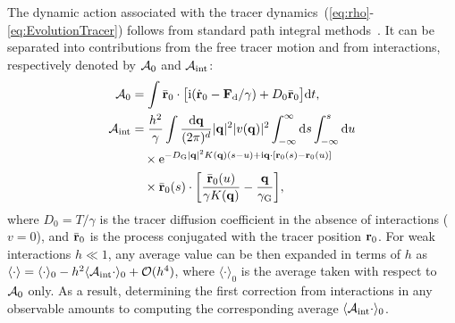 \documentclass[pre, superscriptaddress, twocolumn,pre]{revtex4-1}
\begin{document}
The dynamic action associated with the tracer dynamics~(\ref{eq:rho}-\ref{eq:EvolutionTracer}) follows from standard path integral methods~\cite{Martin1973, Dominicis1975}. It can be separated into contributions from the free tracer motion and from interactions, respectively denoted by ${\cal A}_0$ and ${\cal A}_{\rm int}$:
\begin{equation}\label{eq:action}
	\begin{aligned}
		{\cal A}_0 &= \int \bar{\bf r}_0 \cdot \big[ {\rm i}(\dot{\bf r}_0 - {\bf F}_{\rm d}/\gamma) + D_0 \bar{\bf r}_0 \big] {\rm d}t ,
		\\
		{\cal A}_{\rm int} &= \frac{h^2}{\gamma} \int \frac{{\rm d}{\bf q}}{(2\pi)^d} |{\bf q}|^2 |v({\bf q})|^2 \int_{-\infty}^\infty {\rm d}s\int_{-\infty}^s{\rm d}u
		\\
		&\quad\times {\rm e}^{-D_{\rm G}|{\bf q}|^2K({\bf q})(s-u)+{\rm i}{\bf q}\cdot[{\bf r}_0(s)-{\bf r}_0(u)]}
		\\
		&\quad\times \bar{\bf r}_0(s) \cdot \bigg[ \frac{\bar{\bf r}_0(u)}{\gamma K({\bf q})} - \frac{{\bf q}}{\gamma_{\rm G}} \bigg] ,
	\end{aligned}
\end{equation}
where $D_0=T/\gamma$ is the tracer diffusion coefficient in the absence of interactions ($v=0$), and $\bar{\bf r}_0$ is the process conjugated with the tracer position ${\bf r}_0$. For weak interactions $h\ll1$, any average value can be then expanded in terms of $h$ as $\langle\cdot\rangle=\langle\cdot\rangle_0 - h^2 \langle{\cal A}_{\rm int}\cdot\rangle_0 + {\cal O}(h^4)$, where $\langle\cdot\rangle_0$ is the average taken with respect to ${\cal A}_0$ only. As a result, determining the first correction from interactions in any observable amounts to computing the corresponding average $\langle{\cal A}_{\rm int}\cdot\rangle_0$.
\end{document}
